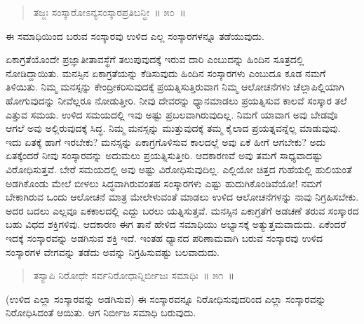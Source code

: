 \vspace{-0.3cm}

\begin{verse}
ತಜ್ಜಃ ಸಂಸ್ಕಾರೋಽನ್ಯಸಂಸ್ಕಾರಪ್ರತಿಬನ್ಧೀ~॥ ೫೦~॥
\end{verse}

\vspace{-0.3cm}

ಈ ಸಮಾಧಿಯಿಂದ ಬರುವ ಸಂಸ್ಕಾರವು ಉಳಿದ ಎಲ್ಲ ಸಂಸ್ಕಾರಗಳನ್ನೂ ತಡೆಯುವುದು. 

ಏಕಾಗ್ರತೆಯೊಂದೇ ಪ್ರಜ್ಞಾತೀತಾವಸ್ಥೆಗೆ ತಲುಪುವುದಕ್ಕೆ ಇರುವ ದಾರಿ ಎಂಬುದನ್ನು ಹಿಂದಿನ ಸೂತ್ರದಲ್ಲಿ ನೋಡಿದ್ದಾಯಿತು. ಮನಸ್ಸಿನ ಏಕಾಗ್ರತೆಯನ್ನು ಕೆಡಿಸುವುದು ಹಿಂದಿನ ಸಂಸ್ಕಾರಗಳು ಎಂಬುದೂ ಕೂಡ ನಮಗೆ ತಿಳಿಯಿತು. ನಿಮ್ಮ ಮನಸ್ಸನ್ನು ಕೇಂದ್ರೀಕರಿಸುವುದಕ್ಕೆ ಪ್ರಯತ್ನಿಸುತ್ತಿರುವಾಗ ನಿಮ್ಮ ಆಲೋಚನೆಗಳು ಚೆಲ್ಲಾಪಿಲ್ಲಿಯಾಗಿ ಹೋಗುವುದನ್ನು ನೀವೆಲ್ಲರೂ ನೋಡುತ್ತೀರಿ. ನೀವು ದೇವರನ್ನು ಧ್ಯಾನಮಾಡಲು ಪ್ರಯತ್ನಿಸುವ ಕಾಲವೆ ಸಂಸ್ಕಾರ ತಲೆ ಎತ್ತುವ ಸಮಯ. ಉಳಿದ ಸಮಯದಲ್ಲಿ ಇವು ಅಷ್ಟು ಪ್ರಬಲವಾಗಿರುವುದಿಲ್ಲ. ನಿಮಗೆ ಯಾವಾಗ ಅವು ಬೇಡವೊ ಆಗಲೆ ಅವು ಅಲ್ಲಿರುವುದಕ್ಕೆ ಸಿದ್ಧ. ನಿಮ್ಮ ಮನಸ್ಸನ್ನು ಮುತ್ತುವುದಕ್ಕೆ ತಮ್ಮ ಕೈಲಾದ ಪ್ರಯತ್ನವನ್ನೆಲ್ಲ ಮಾಡುವುವು. ಇದು ಏತಕ್ಕೆ ಹಾಗೆ ಇರಬೇಕು? ಮನಸ್ಸನ್ನು ಏಕಾಗ್ರಗೊಳಿಸುವ ಕಾಲದಲ್ಲೆ ಅವು ಏಕೆ ಹೀಗೆ ಆಗಬೇಕು? ಅದು ಏತಕ್ಕೆಂದರೆ ನೀವು ಸಂಸ್ಕಾರವನ್ನು ಅದುಮಲು ಪ್ರಯತ್ನಿಸುತ್ತೀರಿ. ಆದಕಾರಣವೆ ಅವು ತಮಗೆ ಸಾಧ್ಯವಾದಷ್ಟು ವಿರೋಧಿಸುತ್ತವೆ. ಬೇರೆ ಸಮಯದಲ್ಲಿ ಅವು ಅಷ್ಟು ವಿರೋಧಿಸುವುದಿಲ್ಲ. ಎಲ್ಲಿಯೋ ಚಿತ್ತದ ಗುಹೆಯಲ್ಲಿ ಹುಲಿಯಂತೆ ಅಡಗಿಕೊಂಡು ಮೇಲೆ ಬೀಳಲು ಸಿದ್ಧವಾಗಿರುವಂತಹ ಸಂಸ್ಕಾರಗಳು ಎಷ್ಟು ಹುದುಗಿಕೊಂಡಿವೆಯೋ! ನಮಗೆ ಬೇಕಾಗಿರುವ ಒಂದು ಆಲೋಚನೆ ಮಾತ್ರ ಮೇಲೇಳುವಂತೆ ಮಾಡಲು ಉಳಿದ ಆಲೋಚನೆಗಳನ್ನು ನಾವು ನಿಗ್ರಹಿಸಬೇಕು. ಅದರ ಬದಲು ಎಲ್ಲವೂ ಏಕಕಾಲದಲ್ಲಿ ಎದ್ದು ಬರಲು ಯತ್ನಿಸುತ್ತವೆ. ಮನಸ್ಸಿನ ಏಕಾಗ್ರತೆಗೆ ಅಡಚಣೆ ತರುವ ಸಂಸ್ಕಾರದ ಬಹು ವಿಧದ ಶಕ್ತಿಗಳಿವು. ಆದಕಾರಣ ಈಗ ತಾನೆ ಹೇಳಿದ ಸಮಾಧಿಯು ಅಭ್ಯಾಸಕ್ಕೆ ಅತ್ಯುತ್ತಮವಾದುದು. ಏಕೆಂದರೆ ಇದಕ್ಕೆ ಸಂಸ್ಕಾರವನ್ನು ಅಡಗಿಸುವ ಶಕ್ತಿ ಇದೆ. ಇಂತಹ ಧ್ಯಾನದ ಪರಿಣಾಮವಾಗಿ ಬರುವ ಸಂಸ್ಕಾರವು ಉಳಿದ ಸಂಸ್ಕಾರಗಳ ವೇಗವನ್ನು ತಡೆದು ಅವನ್ನು ನಿಗ್ರಹಿಸುವಷ್ಟು ಬಲವಾದುದು. 

\vspace{-0.3cm}

\begin{verse}
ತಸ್ಯಾಪಿ ನಿರೋಧೇ ಸರ್ವನಿರೋಧಾನ್ನಿರ್ಬೀಜಃ ಸಮಾಧಿಃ~॥ ೫೧~॥
\end{verse}

\vspace{-0.3cm}

(ಉಳಿದ ಎಲ್ಲಾ ಸಂಸ್ಕಾರವನ್ನು ಅಡಗಿಸುವ) ಈ ಸಂಸ್ಕಾರವನ್ನೂ ನಿರೋಧಿಸುವುದರಿಂದ ಎಲ್ಲಾ ಸಂಸ್ಕಾರವನ್ನು ನಿರೋಧಿಸಿದಂತೆ ಆಯಿತು. ಆಗ ನಿರ್ಬೀಜ ಸಮಾಧಿ ಬರುವುದು. 

